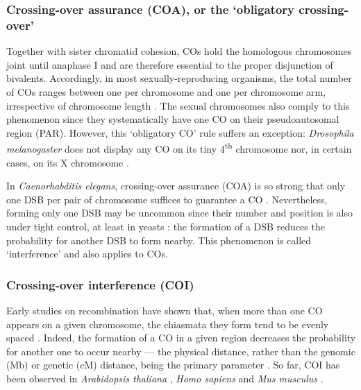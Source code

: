 \subsubsection{Crossing-over assurance (COA), or the ‘obligatory crossing-over’}
Together with sister chromatid cohesion, COs hold the homologous chromosomes joint until anaphase I \citep[reviewed in][]{roeder1997meiotic} and are therefore essential to the proper disjunction of bivalents.
Accordingly, in most sexually-reproducing organisms, the total number of COs ranges between one per chromosome and one per chromosome arm, irrespective of chromosome length \citep{pardo-manueldevillena2001recombination,dumas2002chromosomal,hillers2003chromosomewide,dumont2017variation}. 
The sexual chromosomes also comply to this phenomenon since they systematically have one CO on their pseudoautosomal region (PAR).
However, this ‘obligatory CO’ rule suffers an exception: \textit{Drosophila melanogaster} does not display any CO on its tiny 4\textsuperscript{th} chromosome nor, in certain cases, on its X chromosome \citep{orr-weaver1995meiosis, koehler1998human}.

In \textit{Caenorhabditis elegans}, crossing-over assurance (COA) is so strong that only one DSB per pair of chromosome suffices to guarantee a CO \citep{rosu2011robust}.
Nevertheless, forming only one DSB may be uncommon since their number and position is also under tight control, at least in yeasts \citep{wu1995factors,fan1997competition,robine2007genomewide,anderson2015reduced}: the formation of a DSB reduces the probability for another DSB to form nearby. 
This phenomenon is called ‘interference’ and also applies to COs.



\subsubsection{Crossing-over interference (COI)}

Early studies on recombination \citep{sturtevant1915behavior,muller1916mechanism} have shown that, when more than one CO appears on a given chromosome, the chiasmata they form tend to be evenly spaced \citep{jones1967control, jones1974correlated, jones1984control,jones2006meiotic}.
Indeed, the formation of a CO in a given region decreases the probability for another one to occur nearby \citep{vanveen2003meiosis,hillers2004crossover} — the physical distance, rather than the genomic (Mb) or genetic (cM) distance, being the primary parameter \citep{wang2015meiotic}.
So far, COI has been observed in \textit{Arabidopsis thaliana} \citep{drouaud2007sexspecific}, \textit{Homo sapiens} \citep{laurie1985further,broman2000characterization} and \textit{Mus musculus} \citep{lawrie1995chiasma,anderson1999distribution,broman2002crossover}.\\

